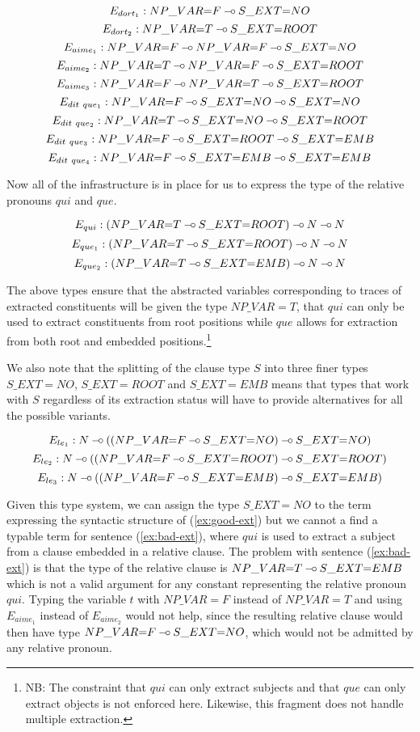 $$
E_{dort_1} : NP\_VAR{=}F \mathbin{{-}\mkern-3.5mu{\circ}} S\_EXT{=}NO
$$
$$
E_{dort_2} : NP\_VAR{=}T \mathbin{{-}\mkern-3.5mu{\circ}} S\_EXT{=}ROOT
$$
$$
E_{aime_1} : NP\_VAR{=}F \mathbin{{-}\mkern-3.5mu{\circ}} NP\_VAR{=}F \mathbin{{-}\mkern-3.5mu{\circ}} S\_EXT{=}NO
$$
$$
E_{aime_2} : NP\_VAR{=}T \mathbin{{-}\mkern-3.5mu{\circ}} NP\_VAR{=}F \mathbin{{-}\mkern-3.5mu{\circ}} S\_EXT{=}ROOT
$$
$$
E_{aime_3} : NP\_VAR{=}F \mathbin{{-}\mkern-3.5mu{\circ}} NP\_VAR{=}T \mathbin{{-}\mkern-3.5mu{\circ}} S\_EXT{=}ROOT
$$
$$
E_{dit\ que_1} : NP\_VAR{=}F \mathbin{{-}\mkern-3.5mu{\circ}} S\_EXT{=}NO \mathbin{{-}\mkern-3.5mu{\circ}} S\_EXT{=}NO
$$
$$
E_{dit\ que_2} : NP\_VAR{=}T \mathbin{{-}\mkern-3.5mu{\circ}} S\_EXT{=}NO \mathbin{{-}\mkern-3.5mu{\circ}} S\_EXT{=}ROOT
$$
$$
E_{dit\ que_3} : NP\_VAR{=}F \mathbin{{-}\mkern-3.5mu{\circ}} S\_EXT{=}ROOT \mathbin{{-}\mkern-3.5mu{\circ}} S\_EXT{=}EMB
$$
$$
E_{dit\ que_4} : NP\_VAR{=}F \mathbin{{-}\mkern-3.5mu{\circ}} S\_EXT{=}EMB \mathbin{{-}\mkern-3.5mu{\circ}} S\_EXT{=}EMB
$$

Now all of the infrastructure is in place for us to express the type of
the relative pronouns $qui$ and $que$.

$$
E_{qui} : (NP\_VAR{=}T \mathbin{{-}\mkern-3.5mu{\circ}} S\_EXT{=}ROOT) \mathbin{{-}\mkern-3.5mu{\circ}} N \mathbin{{-}\mkern-3.5mu{\circ}} N
$$
$$
E_{que_1} : (NP\_VAR{=}T \mathbin{{-}\mkern-3.5mu{\circ}} S\_EXT{=}ROOT) \mathbin{{-}\mkern-3.5mu{\circ}} N \mathbin{{-}\mkern-3.5mu{\circ}} N
$$
$$
E_{que_2} : (NP\_VAR{=}T \mathbin{{-}\mkern-3.5mu{\circ}} S\_EXT{=}EMB) \mathbin{{-}\mkern-3.5mu{\circ}} N \mathbin{{-}\mkern-3.5mu{\circ}} N
$$

The above types ensure that the abstracted variables corresponding to
traces of extracted constituents will be given the type $NP\_VAR{=}T$,
that $qui$ can only be used to extract constituents from root positions
while $que$ allows for extraction from both root and embedded
positions.\footnote{NB: The constraint that $qui$ can only extract
  subjects and that $que$ can only extract objects is not enforced
  here. Likewise, this fragment does not handle multiple extraction.}

We also note that the splitting of the clause type $S$ into three finer
types $S\_EXT={NO}$, $S\_EXT{=}ROOT$ and $S\_EXT{=}EMB$ means that types
that work with $S$ regardless of its extraction status will have to
provide alternatives for all the possible variants.

$$
E_{le_1} : N \mathbin{{-}\mkern-3.5mu{\circ}} ((NP\_VAR{=}F \mathbin{{-}\mkern-3.5mu{\circ}} S\_EXT{=}NO) \mathbin{{-}\mkern-3.5mu{\circ}} S\_EXT{=}NO)
$$
$$
E_{le_2} : N \mathbin{{-}\mkern-3.5mu{\circ}} ((NP\_VAR{=}F \mathbin{{-}\mkern-3.5mu{\circ}} S\_EXT{=}ROOT) \mathbin{{-}\mkern-3.5mu{\circ}} S\_EXT{=}ROOT)
$$
$$
E_{le_3} : N \mathbin{{-}\mkern-3.5mu{\circ}} ((NP\_VAR{=}F \mathbin{{-}\mkern-3.5mu{\circ}} S\_EXT{=}EMB) \mathbin{{-}\mkern-3.5mu{\circ}} S\_EXT{=}EMB)
$$

%
%

Given this type system, we can assign the type $S\_EXT{=}NO$ to the term
expressing the syntactic structure of (\ref{ex:good-ext}) but we cannot
a find a typable term for sentence (\ref{ex:bad-ext}), where $qui$ is
used to extract a subject from a clause embedded in a relative clause.
The problem with sentence (\ref{ex:bad-ext}) is that the type of the
relative clause is $NP\_VAR{=}T \mathbin{{-}\mkern-3.5mu{\circ}} S\_EXT{=}EMB$ which is not a valid
argument for any constant representing the relative pronoun
$qui$. Typing the variable $t$ with $NP\_VAR{=}F$ instead of
$NP\_VAR{=}T$ and using $E_{aime_1}$ instead of $E_{aime_2}$ would not
help, since the resulting relative clause would then have type
$NP\_VAR{=}F \mathbin{{-}\mkern-3.5mu{\circ}} S\_EXT{=}NO$, which would not be admitted by any
relative pronoun.

